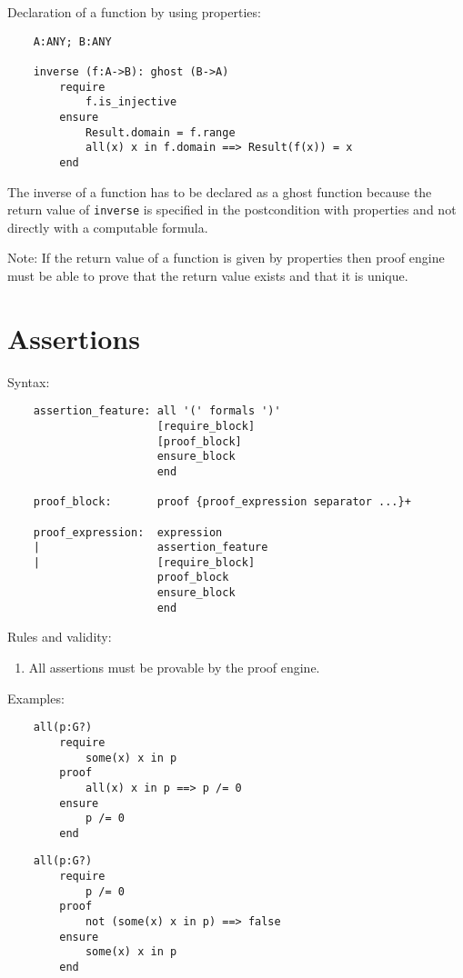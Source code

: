 \noindent Declaration of a function by using properties:
\begin{lstlisting}
    A:ANY; B:ANY

    inverse (f:A->B): ghost (B->A)
        require
            f.is_injective
        ensure
            Result.domain = f.range
            all(x) x in f.domain ==> Result(f(x)) = x
        end
\end{lstlisting}
%
The inverse of a function has to be declared as a ghost function because the
return value of \lstinline!inverse! is specified in the postcondition with
properties and not directly with a computable formula.

Note: If the return value of a function is given by properties then proof
engine must be able to prove that the return value exists and that it is
unique.



\section{Assertions} \label{assertions}

\noindent Syntax:
\begin{lstlisting}
    assertion_feature: all '(' formals ')'
                       [require_block]
                       [proof_block]
                       ensure_block
                       end

    proof_block:       proof {proof_expression separator ...}+

    proof_expression:  expression
    |                  assertion_feature
    |                  [require_block]
                       proof_block
                       ensure_block
                       end
\end{lstlisting}

\noindent Rules and validity:
\begin{enumerate}
\item All assertions must be provable by the proof engine.
\end{enumerate}

\noindent Examples:

\begin{lstlisting}
    all(p:G?)
        require
            some(x) x in p
        proof
            all(x) x in p ==> p /= 0    
        ensure
            p /= 0
        end  
\end{lstlisting}


\begin{lstlisting}
    all(p:G?)
        require
            p /= 0
        proof
            not (some(x) x in p) ==> false
        ensure
            some(x) x in p
        end
\end{lstlisting}

